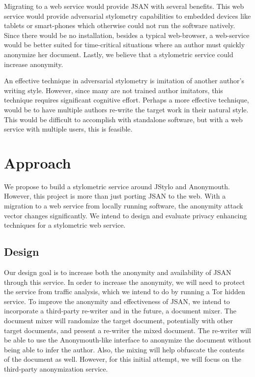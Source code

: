 \documentclass[letterpaper]{article}
\begin{document}
Migrating to a web service would provide JSAN with several benefits.
This web service would provide adversarial stylometry capabilities to
embedded devices like tablets or smart-phones which otherwise could
not run the software natively.  Since there would be no installation,
besides a typical web-browser, a web-service would be better suited
for time-critical situations where an author must quickly anonymize
her document.  Lastly, we believe that a stylometric service could
increase anonymity.

An effective technique in adversarial stylometry is imitation of
another author's writing style.  However, since many are not trained
author imitators, this technique requires significant cognitive effort.
Perhaps a more effective technique, would be to have multiple authors
re-write the target work in their natural style.  This would be
difficult to accomplish with standalone software, but with a web
service with multiple users, this is feasible.



\section*{Approach}\label{sec:approach}

We propose to build a stylometric service around JStylo and
Anonymouth.  However, this project is more than just porting JSAN to
the web.  With a migration to a web service from locally running
software, the anonymity attack vector changes significantly.  We
intend to design and evaluate privacy enhancing techniques for
a stylometric web service.

\subsection{Design}

Our design goal is to increase both the anonymity and availability of
JSAN through this service.  In order to increase the anonymity, we
will need to protect the service from traffic analysis, which we
intend to do by running a Tor hidden service.  To improve the
anonymity and effectiveness of JSAN, we intend to incorporate a
third-party re-writer and in the future, a document mixer.  The
document mixer will randomize the target document, potentially with
other target documents, and present a re-writer the mixed document.
The re-writer will be able to use the Anonymouth-like interface to
anonymize the document without being able to infer the author.  Also,
the mixing will help obfuscate the contents of the document as well.
However, for this initial attempt, we will focus on the third-party
anonymization service.
\end{document}
